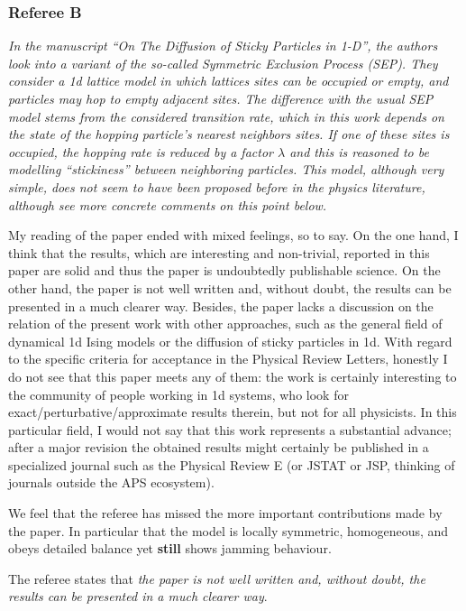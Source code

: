 \documentclass[a4paper,10pt]{article}
\begin{document}
\subsubsection*{Referee B}
{\it
   In the manuscript ``On The Diffusion of Sticky Particles in 1-D'', the
   authors look into a variant of the so-called Symmetric Exclusion
   Process (SEP). They consider a 1d lattice model in which lattices
   sites can be occupied or empty, and particles may hop to empty
   adjacent sites. The difference with the usual SEP model stems from the
   considered transition rate, which in this work depends on the state of
   the hopping particle's nearest neighbors sites. If one of these sites
   is occupied, the hopping rate is reduced by a factor $\lambda$ and
   this is reasoned to be modelling ``stickiness'' between neighboring
   particles. This model, although very simple, does not seem to have
   been proposed before in the physics literature, although see more
   concrete comments on this point below.
  
   My reading of the paper ended with mixed feelings, so to say. On the
   one hand, I think that the results, which are interesting and
   non-trivial, reported in this paper are solid and thus the paper is
   undoubtedly publishable science. On the other hand, the paper is not
   well written and, without doubt, the results can be presented in a
   much clearer way. Besides, the paper lacks a discussion on the
   relation of the present work with other approaches, such as the
   general field of dynamical 1d Ising models or the diffusion of sticky
   particles in 1d. With regard to the specific criteria for acceptance
   in the Physical Review Letters, honestly I do not see that this paper
   meets any of them: the work is certainly interesting to the community
   of people working in 1d systems, who look for
   exact/perturbative/approximate results therein, but not for all
   physicists. In this particular field, I would not say that this work
   represents a substantial advance; after a major revision the obtained
   results might certainly be published in a specialized journal such as
   the Physical Review E (or JSTAT or JSP, thinking of journals outside
   the APS ecosystem).
}

We feel that the referee has missed the more important contributions
made by the paper.  In particular that the model is locally symmetric,
homogeneous, and obeys detailed balance yet {\bf still} shows jamming
behaviour.

The referee states that {\it the paper is not well
  written and, without doubt, the results can be presented in a much
  clearer way}.  
\end{document}
